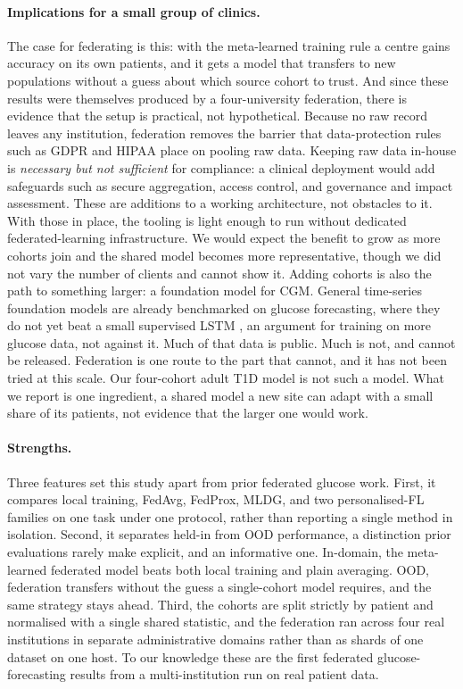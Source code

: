 \documentclass[10pt,letterpaper]{article}
\begin{document}
\paragraph{Implications for a small group of clinics.} The case for
federating is this: with the meta-learned training rule a centre gains
accuracy on its own patients, and it gets a model that transfers to new
populations without a guess about which source cohort to trust. And since these results were themselves produced by a
four-university federation, there is evidence that the setup is practical,
not hypothetical. Because no raw record leaves any institution, federation
removes the barrier that data-protection rules such as GDPR and HIPAA place
on pooling raw data. Keeping raw data in-house is \emph{necessary but not
sufficient} for compliance: a clinical deployment would add safeguards such as
secure aggregation, access control, and governance and impact assessment.
These are additions to a working architecture, not obstacles to it. With those in
place, the tooling is light enough to run without dedicated
federated-learning infrastructure. We
would expect the benefit to grow as more cohorts join and the shared model
becomes more representative, though we did not vary the number of clients and
cannot show it. Adding cohorts is also the path to something larger: a
foundation model for CGM. General time-series foundation models are already
benchmarked on glucose forecasting, where they do not yet beat a small
supervised LSTM \cite{lu2026glucofmbench}, an argument for training on
more glucose data, not against it. Much of that data is public. Much is not,
and cannot be released. Federation is one route to the part that cannot, and
it has not been tried at this scale. Our four-cohort adult T1D model is not
such a model. What we report is one ingredient, a shared model a new site
can adapt with a small share of its patients, not evidence that the larger
one would work.

\paragraph{Strengths.} Three features set this study apart from prior
federated glucose work. First, it compares local training, FedAvg, FedProx,
MLDG, and two personalised-FL families on one task under one protocol, rather
than reporting a single method in isolation. Second, it separates held-in
from OOD performance, a distinction prior evaluations rarely make
explicit, and an informative one. In-domain, the meta-learned federated
model beats both local training and plain averaging. OOD, federation transfers
without the guess a single-cohort model requires, and the same strategy stays
ahead. Third, the cohorts are split strictly by patient and normalised
with a single shared statistic, and the federation ran across four real
institutions in separate administrative domains rather than as shards of one
dataset on one host. To our knowledge these are the first federated
glucose-forecasting results from a multi-institution run on real patient data.
\end{document}
